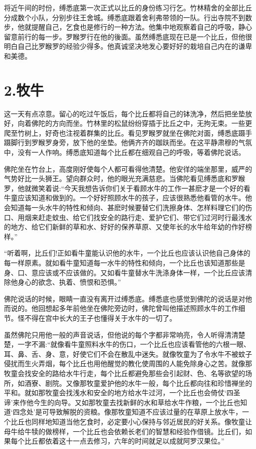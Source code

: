 \documentclass[12pt,twoside,openany]{book}
\begin{document}
将近午间的时份，缚悉底第一次正式以比丘的身份练习行乞。竹林精舍的全部比丘分成数个小队，分别步往王舍城。缚悉底跟着舍利弗带领的一队。行出寺院不到数步，他就提醒自己，乞食也是修行的一种方法。他集中地观察着自己的呼吸，静心留意前行的每一步。罗睺罗行在他的後面。虽然缚悉底现在已是一个比丘，但他很明白自己比罗睺罗的经验少得多。他真诚坚决地发心要好好的栽培自己内在的谦卑和美德。

\chapter{2.牧牛}\label{ch2}

这一天有点凉意。留心的吃过午饭后，每个比丘都将自己的钵洗净，然后把坐垫放好，向着佛陀的方向而坐。竹林里的松鼠纷纷穿插于比丘之中，无拘无束。一些更爬至竹树上，好奇也注视着群集的比丘。看见罗睺罗就坐在佛陀对面，缚悉底蹑手蹑脚行到罗睺罗身旁，放下他的坐垫。他俩齐齐的跏趺而坐。在这平静肃穆的气氛中，没有一人作响。缚悉底知道每个比丘都在细观自己的呼吸，等着佛陀说话。

佛陀坐在竹台上，高度刚好使每个人都可看得他清楚。他安徉的端坐那里，威严的气势好比一头狮王。望向群众时，他的眼光充满慈悲。当佛陀看见缚悉底和罗睺罗，他就微笑着说:“今天我想告诉你们关于看顾水牛的工作一甚麽才是一个好的看牛童应该知道和做到的。一个好好照顾水牛的孩子，应该很熟悉他看管的水牛。他会知道每一头水牛的特性和倾向、甚麽时候要替它们洗擦身体、怎样料理它们的伤口、用烟来赶走蚊虫、给它们找安全的路行走、爱护它们、带它们过河时行最浅水的地方、给它们新鲜的草和水、好好的保养草原、又使年长的水牛给年幼的作好榜样。”

“听着啊，比丘们!正如看牛童能认识他的水牛，一个比丘也应该认识他自己身体的每一样原素。就如看牛童知道每一水牛的特性和倾向，一个比丘也该知道那些是身、口、意应该或不应该做的。又如看牛童替水牛洗涤身体一样，一个比丘应该清除他身心的欲念、执着、愤恨和恐惧。”

佛陀说话的时候，眼睛一直没有离开过缚悉底。缚悉底也感觉到佛陀的说话是对他而说的。他回想起多年前他坐在佛陀旁边时，佛陀曾叫他描述照顾水牛的工作细节。怪不得在宫中长大的王子也懂得关于水牛的一切了。

虽然佛陀只用他一般的声音说话，但他说的每个字都非常响亮，令人听得清清楚楚，一字不漏:“就像看牛童照料水牛的伤口，一个比丘也应该看管他的六根一眼、耳、鼻、舌、身、意，好使它们不会在散乱中迷失。就像牧童为了令水牛不被蚊子侵扰而生火弄烟，每个比丘也用他醒觉的教化使周围的人能免除身心之苦。就像那牧童会找安全的路给水牛行走，每个比丘都避免那些会引起财、色、名等欲望的场所，如酒寮、剧院。又像那牧童爱护他的水牛一般，每个比丘都向往和珍惜禅坐的平和。就如那牧童会找浅水和安全的地方给水牛过河，一个比丘也会倚仗‘四圣谛’来作他今生的向导。又如那牧童去找新鲜的水和草给水牛作粮，一个比丘也知道‘四念处’是可导致解脱的资粮。像那牧童知道不应该过量的在草原上放水牛，一个比丘也同样地知道当他乞食时，必定要小心保持与邻近居民的好关系。像牧童让母牛给牛犊的做榜样，一个比丘也会依赖长老们的智慧和经验作借镜。比丘们，如果每个比丘都依着这十一点去修习，六年的时间就足以成就阿罗汉果位。”
\end{document}
